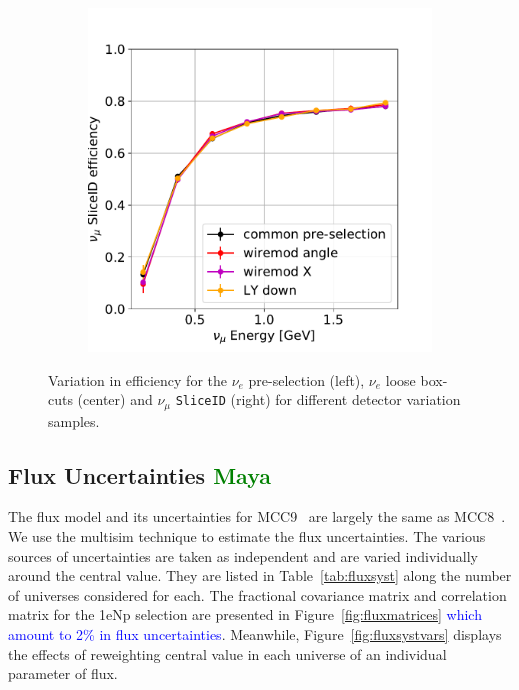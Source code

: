 \documentclass[a4paper]{article}
\begin{document}
\begin{figure}[H]
\begin{center}
\begin{subfigure}[b]{0.3\textwidth}
    \end{subfigure}
    \begin{subfigure}[b]{0.3\textwidth}
    \centering
    \includegraphics[width=1.00\textwidth]{detsys/nu_e01162020_numu_slice_eff.pdf}
    \end{subfigure}
\caption{\label{fig:detsys:dedx:eLEElow}Variation in efficiency for the $\nu_e$ pre-selection (left), $\nu_e$ loose box-cuts (center) and $\nu_{\mu}$ \texttt{SliceID} (right) for different detector variation samples.}
\end{center}
\end{figure}

\subsection{Flux Uncertainties \textcolor{green}{Maya}}
The flux model and its uncertainties for MCC9~\cite{bib:fluxmcc9,bib:fluxtechnote} are largely the same as MCC8~\cite{bib:fluxtechnote}. We use the multisim technique to estimate the flux uncertainties. The various sources of uncertainties are taken as independent and are varied individually around the central value. They are listed in Table~\ref{tab:fluxsyst} along the number of universes considered for each. The fractional covariance matrix and correlation matrix for the 1eNp selection are presented in Figure~\ref{fig:fluxmatrices} \textcolor{blue}{which amount to 2\% in flux uncertainties}. Meanwhile, Figure~\ref{fig:fluxsystvars} displays the effects of reweighting central value in each universe of an individual parameter of flux.
\end{document}
